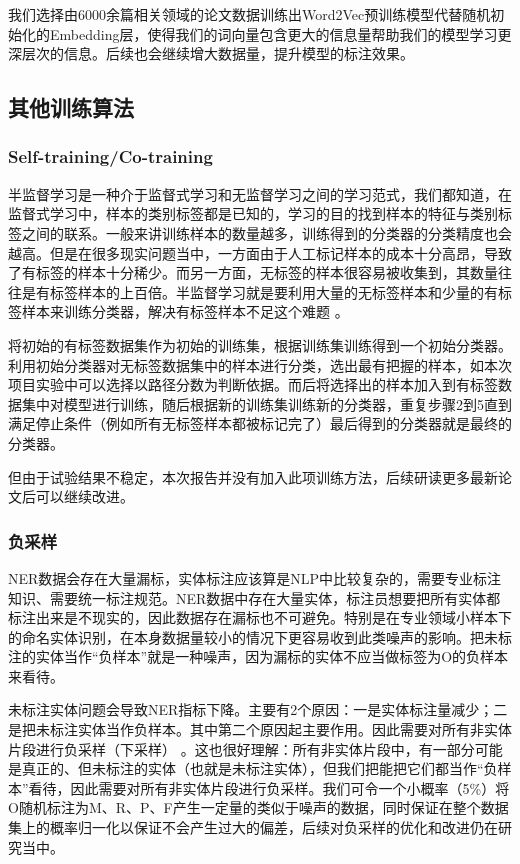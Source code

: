 \documentclass{article}
\begin{document}
我们选择由6000余篇相关领域的论文数据训练出Word2Vec预训练模型代替随机初始化的Embedding层，使得我们的词向量包含更大的信息量帮助我们的模型学习更深层次的信息。后续也会继续增大数据量，提升模型的标注效果。
\subsection{其他训练算法}
\subsubsection{Self-training/Co-training}
半监督学习是一种介于监督式学习和无监督学习之间的学习范式，我们都知道，在监督式学习中，样本的类别标签都是已知的，学习的目的找到样本的特征与类别标签之间的联系。一般来讲训练样本的数量越多，训练得到的分类器的分类精度也会越高。但是在很多现实问题当中，一方面由于人工标记样本的成本十分高昂，导致了有标签的样本十分稀少。而另一方面，无标签的样本很容易被收集到，其数量往往是有标签样本的上百倍。半监督学习就是要利用大量的无标签样本和少量的有标签样本来训练分类器，解决有标签样本不足这个难题\cite{aryoyudanta2016semi} \cite{xie2020self}。


将初始的有标签数据集作为初始的训练集，根据训练集训练得到一个初始分类器。利用初始分类器对无标签数据集中的样本进行分类，选出最有把握的样本，如本次项目实验中可以选择以路径分数为判断依据。而后将选择出的样本加入到有标签数据集中对模型进行训练，随后根据新的训练集训练新的分类器，重复步骤2到5直到满足停止条件（例如所有无标签样本都被标记完了）最后得到的分类器就是最终的分类器。

但由于试验结果不稳定，本次报告并没有加入此项训练方法，后续研读更多最新论文后可以继续改进。

\subsubsection{负采样}
NER数据会存在大量漏标，实体标注应该算是NLP中比较复杂的，需要专业标注知识、需要统一标注规范。NER数据中存在大量实体，标注员想要把所有实体都标注出来是不现实的，因此数据存在漏标也不可避免。特别是在专业领域小样本下的命名实体识别，在本身数据量较小的情况下更容易收到此类噪声的影响。把未标注的实体当作“负样本”就是一种噪声，因为漏标的实体不应当做标签为O的负样本来看待。

未标注实体问题会导致NER指标下降。主要有2个原因：一是实体标注量减少；二是把未标注实体当作负样本。其中第二个原因起主要作用。因此需要对所有非实体片段进行负采样（下采样）\cite{li2020empirical} 。这也很好理解：所有非实体片段中，有一部分可能是真正的、但未标注的实体（也就是未标注实体），但我们把能把它们都当作“负样本”看待，因此需要对所有非实体片段进行负采样。我们可令一个小概率（5\%）将O随机标注为M、R、P、F产生一定量的类似于噪声的数据，同时保证在整个数据集上的概率归一化以保证不会产生过大的偏差，后续对负采样的优化和改进仍在研究当中。
\end{document}

